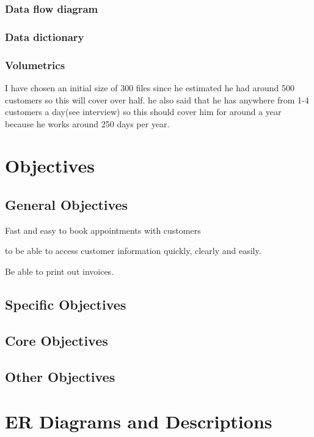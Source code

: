 \documentclass{article}
\begin{document}
	\subsubsection{Data flow diagram}

	

	\subsubsection{Data dictionary}

	\subsubsection{Volumetrics}

		I have chosen an initial size of 300 files since he estimated he had around 500 customers so this will cover over half. he also said that he has anywhere from 1-4 customers a day(see interview) so this should cover him for around a year because he works around 250 days per year.

\section{Objectives}

	\subsection{General Objectives}
		Fast and easy to book appointments with customers
		
		to be able to access customer information quickly, clearly and easily.
		
		Be able to print out invoices.
		
		
		

	\subsection{Specific Objectives}

	\subsection{Core Objectives}

	\subsection{Other Objectives}

\section{ER Diagrams and Descriptions}
\end{document}
